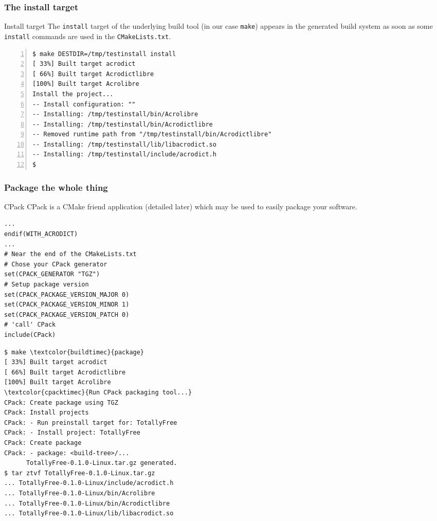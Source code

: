 \documentclass[compress,slidestop,table,usepdftitle=false
              ]
               {beamer}
\newcommand{\fname}[1]{\texttt{#1}}
\begin{document}
\begin{frame}[fragile]
\frametitle{The install target}
\begin{block}{Install target}
The \fname{install} target of the underlying build tool (in our case \fname{make})
appears in the generated build system as soon as some \lstinline!install! 
commands are used in the \fname{CMakeLists.txt}.
\end{block}
\begin{Verbatim}[commandchars=\\\{\},fontsize=\scriptsize,numbers=left]
$ make DESTDIR=/tmp/testinstall install
[ 33%] Built target acrodict
[ 66%] Built target Acrodictlibre
[100%] Built target Acrolibre
Install the project...
-- Install configuration: ""
-- Installing: /tmp/testinstall/bin/Acrolibre
-- Installing: /tmp/testinstall/bin/Acrodictlibre
-- Removed runtime path from "/tmp/testinstall/bin/Acrodictlibre"
-- Installing: /tmp/testinstall/lib/libacrodict.so
-- Installing: /tmp/testinstall/include/acrodict.h
$
\end{Verbatim}
\end{frame}

\begin{frame}[fragile]
\frametitle{Package the whole thing}
\vspace*{-0.4cm}
\begin{block}{CPack}
CPack is a CMake friend application (detailed later) which may be used to
easily package your software.
\end{block}
\vspace*{-0.7cm}
\begin{multicols}{2}
\begin{lstlisting}[basicstyle=\tiny,caption=add CPack support,]
...
endif(WITH_ACRODICT)
...
# Near the end of the CMakeLists.txt
# Chose your CPack generator
set(CPACK_GENERATOR "TGZ")
# Setup package version
set(CPACK_PACKAGE_VERSION_MAJOR 0)
set(CPACK_PACKAGE_VERSION_MINOR 1)
set(CPACK_PACKAGE_VERSION_PATCH 0)
# 'call' CPack
include(CPack)
\end{lstlisting}
\columnbreak
\begin{Verbatim}[commandchars=\\\{\},fontsize=\tiny]
$ make \textcolor{buildtimec}{package}
[ 33%] Built target acrodict
[ 66%] Built target Acrodictlibre
[100%] Built target Acrolibre
\textcolor{cpacktimec}{Run CPack packaging tool...}
CPack: Create package using TGZ
CPack: Install projects
CPack: - Run preinstall target for: TotallyFree
CPack: - Install project: TotallyFree
CPack: Create package
CPack: - package: <build-tree>/...
      TotallyFree-0.1.0-Linux.tar.gz generated.
$ tar ztvf TotallyFree-0.1.0-Linux.tar.gz
... TotallyFree-0.1.0-Linux/include/acrodict.h
... TotallyFree-0.1.0-Linux/bin/Acrolibre
... TotallyFree-0.1.0-Linux/bin/Acrodictlibre
... TotallyFree-0.1.0-Linux/lib/libacrodict.so
\end{Verbatim}
\end{multicols}
\end{frame}
\end{document}
